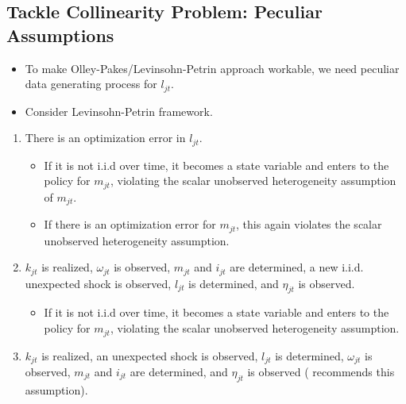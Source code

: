 \documentclass[
]{book}
\providecommand{\tightlist}{%
  \setlength{\itemsep}{0pt}\setlength{\parskip}{0pt}}
\begin{document}
\hypertarget{tackle-collinearity-problem-peculiar-assumptions}{%
\subsection{Tackle Collinearity Problem: Peculiar Assumptions}\label{tackle-collinearity-problem-peculiar-assumptions}}

\begin{itemize}
\tightlist
\item
  To make Olley-Pakes/Levinsohn-Petrin approach workable, we need peculiar data generating process for \(l_{jt}\).
\item
  Consider Levinsohn-Petrin framework.
\end{itemize}

\begin{enumerate}
\def\labelenumi{\arabic{enumi}.}
\tightlist
\item
  There is an optimization error in \(l_{jt}\).

  \begin{itemize}
  \tightlist
  \item
    If it is not i.i.d over time, it becomes a state variable and enters to the policy for \(m_{jt}\), violating the scalar unobserved heterogeneity assumption of \(m_{jt}\).
  \item
    If there is an optimization error for \(m_{jt}\), this again violates the scalar unobserved heterogeneity assumption.
  \end{itemize}
\item
  \(k_{jt}\) is realized, \(\omega_{jt}\) is observed, \(m_{jt}\) and \(i_{jt}\) are determined, a new i.i.d. unexpected shock is observed, \(l_{jt}\) is determined, and \(\eta_{jt}\) is observed.

  \begin{itemize}
  \tightlist
  \item
    If it is not i.i.d over time, it becomes a state variable and enters to the policy for \(m_{jt}\), violating the scalar unobserved heterogeneity assumption.
  \end{itemize}
\item
  \(k_{jt}\) is realized, an unexpected shock is observed, \(l_{jt}\) is determined, \(\omega_{jt}\) is observed, \(m_{jt}\) and \(i_{jt}\) are determined, and \(\eta_{jt}\) is observed (\citet{Ackerberg2016} recommends this assumption).


\end{enumerate}
\end{document}
